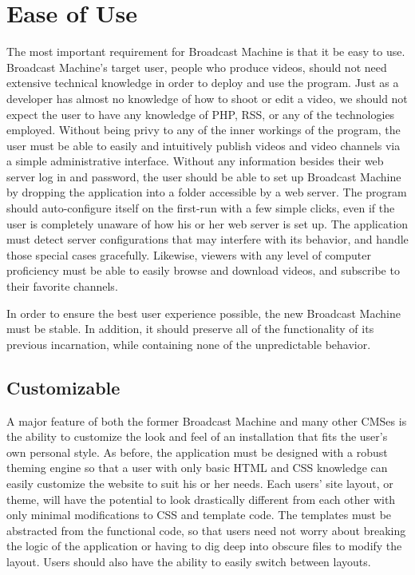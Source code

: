 \documentclass[a4paper,12pt]{report}
\begin{document}
\section{Ease of Use}
The most important requirement for Broadcast Machine is that it be easy to use. 
Broadcast Machine's target user, people who produce videos, should not need extensive technical knowledge in order to deploy and use the program. 
Just as a developer has almost no knowledge of how to shoot or edit a video, we should not expect the user to have any knowledge of PHP, RSS, or any of the technologies employed. 
Without being privy to any of the inner workings of the program, the user must be able to easily and intuitively publish videos and video channels via a simple administrative interface. 
Without any information besides their web server log in and password, the user should be able to set up Broadcast Machine by dropping the application into a folder accessible by a web server. 
The program should auto-configure itself on the first-run with a few simple clicks, even if the user is completely unaware of how his or her web server is set up. 
The application must detect server configurations that may interfere with its behavior, and handle those special cases gracefully. 
Likewise, viewers with any level of computer proficiency must be able to easily browse and download videos, and subscribe to their favorite channels.

In order to ensure the best user experience possible, the new Broadcast Machine must be stable. In addition, it should preserve all of the functionality of its previous incarnation, while containing none of the unpredictable behavior.

\subsection{Customizable} 
A major feature of both the former Broadcast Machine and many other CMSes is the ability to customize the look and feel of an installation that fits the user's own personal style. 
As before, the application must be designed with a robust theming engine so that a user with only basic HTML and CSS knowledge can easily customize the website to suit his or her needs. 
Each users' site layout, or theme, will have the potential to look drastically different from each other with only minimal modifications to CSS and template code. 
The templates must be abstracted from the functional code, so that users need not worry about breaking the logic of the application or having to dig deep into obscure files to modify the layout. 
Users should also have the ability to easily switch between layouts. 
\end{document}
